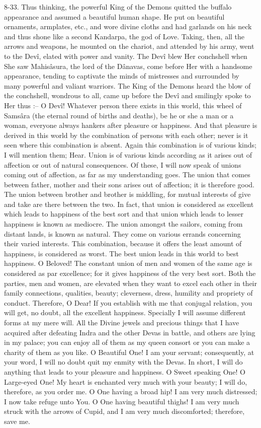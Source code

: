 8-33. Thus thinking, the powerful King of the Demons quitted the buffalo appearance and assumed a beautiful human shape. He put on beautiful ornaments, armplates, etc., and wore divine cloths and had garlands on his neck and thus shone like a second Kandarpa, the god of Love. Taking, then, all the arrows and weapons, he mounted on the chariot, and attended by his army, went to the Dev\^i, elated with power and vanity. The Dev\^i blew Her conchshell when She saw Mahis\^asura, the lord of the D\^anavas, come before Her with a handsome appearance, tending to captivate the minds of mistresses and surrounded by many powerful and valiant warriors. The King of the Demons heard the blow of the conchshell, wondrous to all, came up before the Dev\^i and smilingly spoke to Her thus :-- O Dev\^i! Whatever person there exists in this world, this wheel of Sams\^ara (the eternal round of births and deaths), be he or she a man or a woman, everyone always hankers after pleasure or happiness. And that pleasure is derived in this world by the combination of persons with each other; never is it seen where this combination is absent. Again this combination is of various kinds; I will mention them; Hear. Union is of various kinds according as it arises out of affection or out of natural consequences. Of these, I will now speak of unions coming out of affection, as far as my understanding goes. The union that comes between father, mother and their sons arises out of affection; it is therefore good. The union between brother and brother is middling, for mutual interests of give and take are there between the two. In fact, that union is considered as excellent which leads to happiness of the best sort and that union which leads to lesser happiness is known as mediocre. The union amongst the sailors, coming from distant lands, is known as natural. They come on various errands concerning their varied interests. This combination, because it offers the least amount of happiness, is considered as worst. The best union leads in this world to best happiness. O Beloved! The constant union of men and women of the same age is considered as par excellence; for it gives happiness of the very best sort. Both the parties, men and women, are elevated when they want to excel each other in their family connections, qualities, beauty; cleverness, dress, humility and propriety of conduct. Therefore, O Dear! If you establish with me that conjugal relation, you will get, no doubt, all the excellent happiness. Specially I will assume different forms at my mere will. All the Divine jewels and precious things that I have acquired after defeating Indra and the other Devas in battle, and others are lying in my palace; you can enjoy all of them as my queen consort or you can make a charity of them as you like. O Beautiful One! I am your servant; consequently, at your word, I will no doubt quit my enmity with the Devas. In short, I will do anything that leads to your pleasure and happiness. O Sweet speaking One! O Large-eyed One! My heart is enchanted very much with your beauty; I will do, therefore, as you order me. O One having a broad hip! I am very much distressed; I now take refuge unto You. O One having beautiful thighs! I am very much struck with the arrows of Cupid, and I am very much discomforted; therefore, save me. 